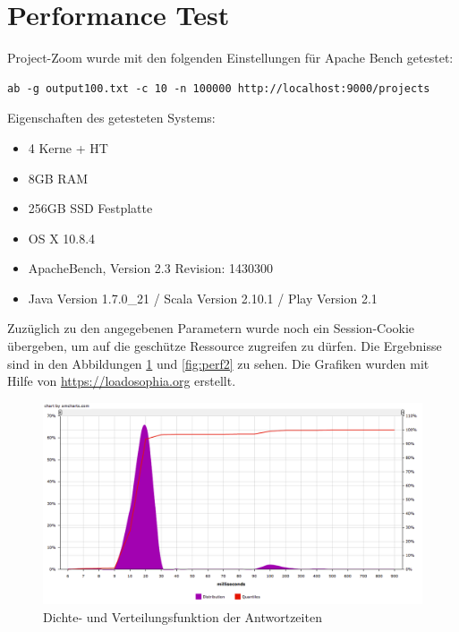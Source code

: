 \section{Performance Test}
\label{sec:performance-test}
Project-Zoom wurde mit den folgenden Einstellungen für Apache Bench getestet:
\begin{lstlisting}
ab -g output100.txt -c 10 -n 100000 http://localhost:9000/projects
\end{lstlisting}

Eigenschaften des getesteten Systems:
\begin{itemize}
\item 4 Kerne + HT
\item 8GB RAM
\item 256GB SSD Festplatte
\item OS X 10.8.4
\item ApacheBench, Version 2.3 Revision: 1430300
\item Java Version 1.7.0\_21 / Scala Version 2.10.1 / Play Version 2.1
\end{itemize}

Zuzüglich zu den angegebenen Parametern wurde noch ein Session-Cookie übergeben, um auf die geschütze \gls{Ressource} zugreifen zu dürfen. Die Ergebnisse sind in den Abbildungen \ref{fig:perf1} und \ref{fig:perf2} zu sehen. Die Grafiken wurden mit Hilfe von \url{https://loadosophia.org} erstellt.

\begin{figure}
  \centering     
  \includegraphics[width=1.0\textwidth]{img/perf1.png}  
   \caption{Dichte- und Verteilungsfunktion der Antwortzeiten }
  \label{fig:perf1} 
\end{figure}

